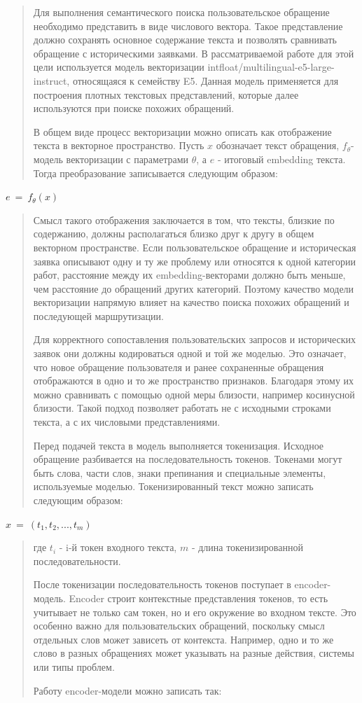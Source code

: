 \begin{quote}
Для выполнения семантического поиска пользовательское обращение
необходимо представить в виде числового вектора. Такое представление
должно сохранять основное содержание текста и позволять сравнивать
обращение с историческими заявками. В рассматриваемой работе для этой
цели используется модель векторизации
intfloat/multilingual-e5-large-instruct, относящаяся к семейству E5.
Данная модель применяется для построения плотных текстовых
представлений, которые далее используются при поиске похожих обращений.

В общем виде процесс векторизации можно описать как отображение текста в
векторное пространство. Пусть \(x\) обозначает текст обращения,
\(f_{\theta}\)- модель векторизации с параметрами \(\theta\), а \(e\) -
итоговый embedding текста. Тогда преобразование записывается следующим
образом:
\end{quote}

\(e\  = \ f_{\theta}(x)\)

\begin{quote}
Смысл такого отображения заключается в том, что тексты, близкие по
содержанию, должны располагаться близко друг к другу в общем векторном
пространстве. Если пользовательское обращение и историческая заявка
описывают одну и ту же проблему или относятся к одной категории работ,
расстояние между их embedding-векторами должно быть меньше, чем
расстояние до обращений других категорий. Поэтому качество модели
векторизации напрямую влияет на качество поиска похожих обращений и
последующей маршрутизации.

Для корректного сопоставления пользовательских запросов и исторических
заявок они должны кодироваться одной и той же моделью. Это означает, что
новое обращение пользователя и ранее сохраненные обращения отображаются
в одно и то же пространство признаков. Благодаря этому их можно
сравнивать с помощью одной меры близости, например косинусной близости.
Такой подход позволяет работать не с исходными строками текста, а с их
числовыми представлениями.

Перед подачей текста в модель выполняется токенизация. Исходное
обращение разбивается на последовательность токенов. Токенами могут быть
слова, части слов, знаки препинания и специальные элементы, используемые
моделью. Токенизированный текст можно записать следующим образом:
\end{quote}

\(x\  = \ (t_{1},t_{2},...,t_{m})\)

\begin{quote}
где \(t_{i}\) - i-й токен входного текста, \(m\) - длина
токенизированной последовательности.

После токенизации последовательность токенов поступает в encoder-модель.
Encoder строит контекстные представления токенов, то есть учитывает не
только сам токен, но и его окружение во входном тексте. Это особенно
важно для пользовательских обращений, поскольку смысл отдельных слов
может зависеть от контекста. Например, одно и то же слово в разных
обращениях может указывать на разные действия, системы или типы проблем.

Работу encoder-модели можно записать так:
\end{quote}

